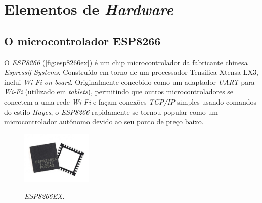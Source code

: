 \begin{table}[H]
	\centering
	\caption{Caracteres especiais utilizados para envio e recebimento no protocolo MQTT.}
	\label{tab:simbolos_mqtt}
\end{table}

\section{Elementos de \textit{Hardware}}
\subsection{O microcontrolador ESP8266}

O \textit{ESP8266} (\autoref{fig:esp8266ex}) é um chip microcontrolador da fabricante chinesa \textit{Espressif Systems}. Construído em torno de um processador Tensilica Xtensa LX3, inclui \textit{Wi-Fi on-board}. Originalmente concebido como um adaptador \textit{UART} para \textit{Wi-Fi} (utilizado em \textit{tablets}), permitindo que outros microcontroladores se conectem a uma rede \textit{Wi-Fi} e façam conexões \textit{TCP/IP} simples usando comandos do estilo \textit{Hayes}, o \textit{ESP8266} rapidamente se tornou popular como um microcontrolador autônomo devido ao seu ponto de preço baixo.

\begin{figure}[H]
	\centering
	\caption{\textit{ESP8266EX}.}
	\includegraphics[width=0.3\textwidth]{figuras/esp8266ex.jpg}
	\label{fig:esp8266ex}
\end{figure} 

